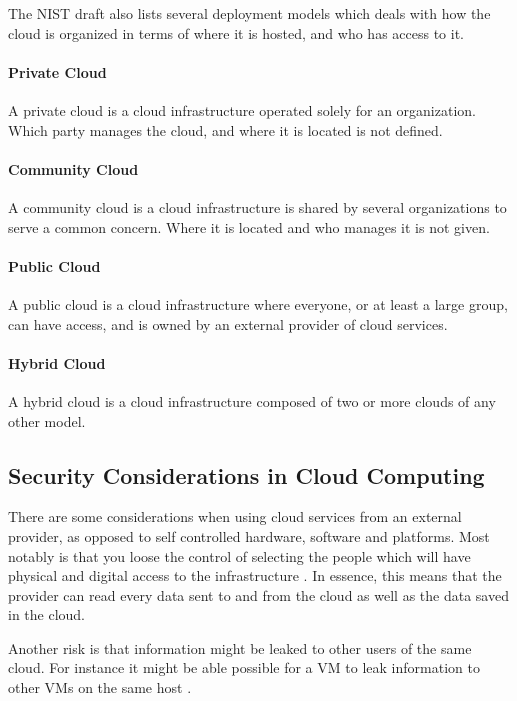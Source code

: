 \documentclass[pdftex,english,10pt,b5paper,twoside]{book}
\begin{document}
The \ac{NIST} draft \cite{cloud_nistdef} also lists several deployment models
which deals with how the cloud is organized in terms of where it is hosted, and
who has access to it.

\paragraph{Private Cloud} A private cloud is a cloud infrastructure operated
solely for an organization. Which party manages the cloud, and where it is
located is not defined.

\paragraph{Community Cloud} A community cloud is a cloud infrastructure is
shared by several organizations to serve a common concern. Where it is located
and who manages it is not given.

\paragraph{Public Cloud} A public cloud is a cloud infrastructure where
everyone, or at least a large group, can have access, and is owned by an external
provider of cloud services.

\paragraph{Hybrid Cloud} A hybrid cloud is a cloud infrastructure composed of
two or more clouds of any other model.

\subsection{Security Considerations in Cloud Computing}

There are some considerations when using cloud services from an external
provider, as opposed to self controlled hardware, software and platforms. Most
notably is that you loose the control of selecting the people which will have
physical and digital access to the infrastructure \cite{cloud_getoff}. In
essence, this means that the provider can read every data sent to and from the
cloud as well as the data saved in the cloud.

Another risk is that information might be leaked to other users of the same
cloud. For instance it might be able possible for a \ac{VM} to leak information
to other \acp{VM} on the same host \cite{cloud_getoff}.
\end{document}
